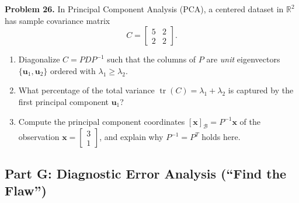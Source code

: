 \documentclass[11pt, letterpaper]{article}
\theoremstyle{definition}
\theoremstyle{remark}
\begin{document}
\textbf{Problem 26.}\label{prob:26}
In Principal Component Analysis (PCA), a centered dataset in $\mathbb{R}^{2}$ has sample covariance matrix
\[
C = \begin{bmatrix} 5 & 2 \\ 2 & 2 \end{bmatrix}.
\]
\begin{enumerate}[label=(\alph*)]
    \item Diagonalize $C = PDP^{-1}$ such that the columns of $P$ are \emph{unit} eigenvectors $\{\mathbf{u}_{1}, \mathbf{u}_{2}\}$ ordered with $\lambda_{1} \ge \lambda_{2}$.
    \item What percentage of the total variance $\operatorname{tr}(C) = \lambda_{1} + \lambda_{2}$ is captured by the first principal component $\mathbf{u}_{1}$?
    \item Compute the principal component coordinates $[\mathbf{x}]_{\mathcal{B}} = P^{-1}\mathbf{x}$ of the observation $\mathbf{x} = \begin{bmatrix} 3 \\ 1 \end{bmatrix}$, and explain why $P^{-1} = P^{T}$ holds here.
\end{enumerate}

\subsection{Part G: Diagnostic Error Analysis (``Find the Flaw'')}
\end{document}
